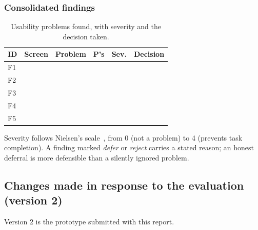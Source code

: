 
\subsubsection{Consolidated findings}

\begin{table}[htbp]
\centering
\caption{Usability problems found, with severity and the decision taken.}
\label{tab:findings}
\small
\begin{tabularx}{\textwidth}{@{}llXlll@{}}
\toprule
\textbf{ID} & \textbf{Screen} & \textbf{Problem} & \textbf{P's} & \textbf{Sev.} & \textbf{Decision} \\
\midrule
F1 & \FILL{} & \FILL{} & \FILL{} & \FILL{} & \FILL{} \\
F2 & \FILL{} & \FILL{} & \FILL{} & \FILL{} & \FILL{} \\
F3 & \FILL{} & \FILL{} & \FILL{} & \FILL{} & \FILL{} \\
F4 & \FILL{} & \FILL{} & \FILL{} & \FILL{} & \FILL{} \\
F5 & \FILL{} & \FILL{} & \FILL{} & \FILL{} & \FILL{} \\
\bottomrule
\end{tabularx}
\end{table}

Severity follows Nielsen's scale~\cite{nielsen1994}, from 0 (not a problem) to 4 (prevents task
completion). A finding marked \emph{defer} or \emph{reject} carries a stated reason; an honest
deferral is more defensible than a silently ignored problem.

\subsection{Changes made in response to the evaluation (version 2)}
\label{sec:changes}

Version 2 is the prototype submitted with this report. 

